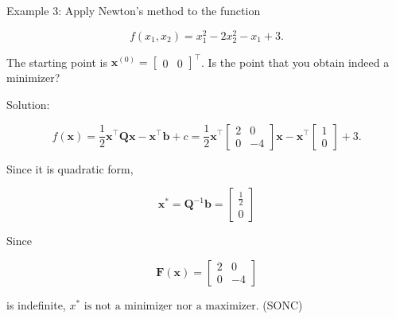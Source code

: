 Example 3: Apply Newton's method to the function

\[
	f\left(x_{1}, x_{2}\right)=x_{1}^{2}-2 x_{2}^{2}-x_{1}+3 .
\]

The starting point is \(\boldsymbol{x}^{(0)}=\left[\begin{array}{ll}0 & 0\end{array}\right]^{\top}\). Is the point that you obtain indeed a minimizer?

Solution:

\[
	f(\boldsymbol{x})=\frac{1}{2} \boldsymbol{x}^{\top} \boldsymbol{Q} \boldsymbol{x}-\boldsymbol{x}^{\top} \boldsymbol{b}+c=\frac{1}{2} \boldsymbol{x}^{\top}\left[\begin{array}{cc}
		2 & 0 \\
		0 & -4
	\end{array}\right] \boldsymbol{x}-\boldsymbol{x}^{\top}\left[\begin{array}{l}
		1 \\
		0
	\end{array}\right]+3 .
\]

Since it is quadratic form,

\[
	\boldsymbol{x}^{*}=\boldsymbol{Q}^{-1} \boldsymbol{b}=\left[\begin{array}{c}
		\frac{1}{2} \\
		0
	\end{array}\right]
\]

Since

\[
	\boldsymbol{F}(\boldsymbol{x})=\left[\begin{array}{cc}
		2 & 0 \\
		0 & -4
	\end{array}\right]
\]

is indefinite, \(\underline{x^{*} \text{ is not a minimizer nor a maximizer}}\). (SONC)
